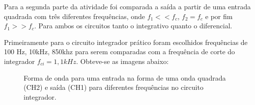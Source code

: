 Para a segunda parte da atividade foi comparada a saída a partir de uma entrada quadrada com três diferentes frequências, onde $f_1<<f_{c}$, $f_2 = f_{c}$ e por fim $f_1>>f_{c}$. Para ambos os circuitos tanto o integrativo quanto o diferencial.

Primeiramente para o circuito integrador prático foram escolhidos frequências de 100 Hz, 10kHz, 850khz para serem comparadas com a frequência de corte do integrador $f_{ci} = 1,1 kHz$. Obteve-se as imagens abaixo:


\begin{figure}[H] 
\centering
{}
\caption{Forma de onda para uma entrada na forma de uma onda quadrada (CH2) e saída (CH1) para diferentes frequências no circuito integrador.}
\end{figure}

